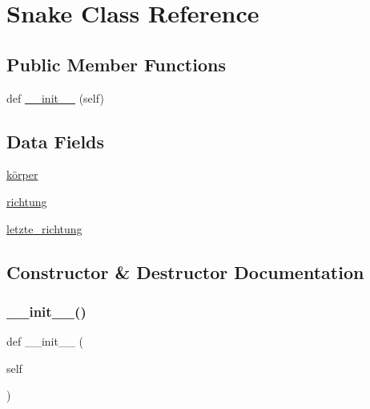 \hypertarget{class_projekt_01_snake_01auf_01_python_1_1_snake}{}\section{Snake Class Reference}
\label{class_projekt_01_snake_01auf_01_python_1_1_snake}
\subsection*{Public Member Functions}
\begin{DoxyCompactItemize}
\item 
def \mbox{\hyperlink{class_projekt_01_snake_01auf_01_python_1_1_snake_ae64f0875afe3067b97ba370b354b9213}{\+\_\+\+\_\+init\+\_\+\+\_\+}} (self)
\end{DoxyCompactItemize}
\subsection*{Data Fields}
\begin{DoxyCompactItemize}
\item 
\mbox{\hyperlink{class_projekt_01_snake_01auf_01_python_1_1_snake_ae2c30b30fec6efcd003971bacc8162bc}{körper}}
\item 
\mbox{\hyperlink{class_projekt_01_snake_01auf_01_python_1_1_snake_a8cb0be1e107de91f5973ecc6ebaca4bc}{richtung}}
\item 
\mbox{\hyperlink{class_projekt_01_snake_01auf_01_python_1_1_snake_a2bcbbcddab94ec52bb201a13fc9054f3}{letzte\+\_\+richtung}}
\end{DoxyCompactItemize}


\subsection{Constructor \& Destructor Documentation}
\mbox{\label{class_projekt_01_snake_01auf_01_python_1_1_snake_ae64f0875afe3067b97ba370b354b9213}} 
\subsubsection{\texorpdfstring{\+\_\+\+\_\+init\+\_\+\+\_\+()}{\_\_init\_\_()}}
{\footnotesize\ttfamily def \+\_\+\+\_\+init\+\_\+\+\_\+ (\begin{DoxyParamCaption}\item[{}]{self }\end{DoxyParamCaption})}



